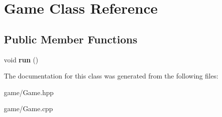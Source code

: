 \hypertarget{class_game}{}\section{Game Class Reference}
\label{class_game}
\subsection*{Public Member Functions}
\begin{DoxyCompactItemize}
\item 
\mbox{\label{class_game_a1ab78f5ed0d5ea879157357cf2fb2afa}} 
void {\bfseries run} ()
\end{DoxyCompactItemize}


The documentation for this class was generated from the following files\+:\begin{DoxyCompactItemize}
\item 
game/Game.\+hpp\item 
game/Game.\+cpp\end{DoxyCompactItemize}
